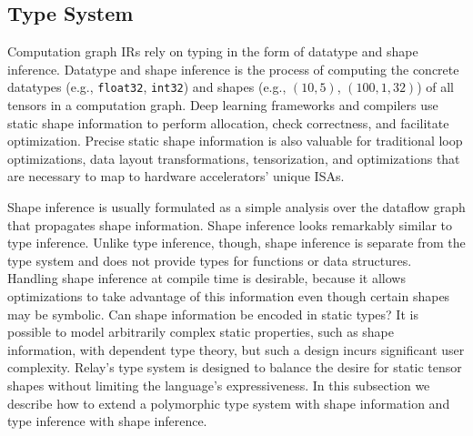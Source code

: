       \subsection{Type System}
      \label{subsec:type_system}

      Computation graph IRs rely on typing in the form of
        datatype and shape inference.
      Datatype and shape inference is the process of computing the
        concrete datatypes (e.g., \verb|float32|, \verb|int32|) and shapes (e.g., $(10, 5)$, $(100, 1, 32)$) of all
        tensors in a computation graph.
      Deep learning frameworks and compilers use static shape information
        to perform allocation, check correctness, and facilitate optimization.
      Precise static shape information is also valuable for traditional loop
        optimizations, data layout transformations, tensorization, and
        optimizations that are necessary to map to hardware accelerators' unique ISAs.

      Shape inference is usually formulated as a simple analysis over the dataflow graph that
        propagates shape information.
      Shape inference looks remarkably similar to type inference.
      Unlike type inference, though, shape inference is separate from the type system and
        does not provide types for functions or data structures.
      Handling shape inference at compile time is desirable, because it allows optimizations to take
        advantage of this information even though certain shapes may be symbolic. Can shape information be encoded in static types?
      It is possible to model arbitrarily complex static properties, such
        as shape information, with dependent type theory, but such
        a design incurs significant user complexity.
      Relay's type system is designed to balance the desire for static tensor shapes
        without limiting the language's expressiveness.
      In this subsection we describe how to extend a polymorphic type system with shape
        information and type inference with shape inference.

